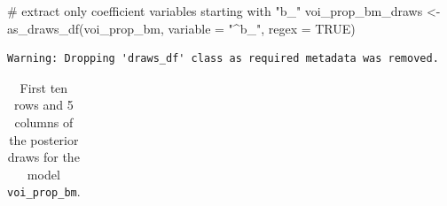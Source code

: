 \documentclass[
  authoryear,
  preprint,
  3p]{elsarticle}
\newenvironment{Shaded}{\begin{snugshade}}{\end{snugshade}}
\newcommand{\AttributeTok}[1]{\textcolor[rgb]{0.40,0.45,0.13}{#1}}
\newcommand{\CommentTok}[1]{\textcolor[rgb]{0.37,0.37,0.37}{#1}}
\newcommand{\ConstantTok}[1]{\textcolor[rgb]{0.56,0.35,0.01}{#1}}
\newcommand{\FunctionTok}[1]{\textcolor[rgb]{0.28,0.35,0.67}{#1}}
\newcommand{\NormalTok}[1]{\textcolor[rgb]{0.00,0.23,0.31}{#1}}
\newcommand{\OtherTok}[1]{\textcolor[rgb]{0.00,0.23,0.31}{#1}}
\newcommand{\StringTok}[1]{\textcolor[rgb]{0.13,0.47,0.30}{#1}}
\begin{document}
\begin{Shaded}
\begin{Highlighting}[]
\CommentTok{\# extract only coefficient variables starting with "b\_"}
\NormalTok{voi\_prop\_bm\_draws }\OtherTok{\textless{}{-}} \FunctionTok{as\_draws\_df}\NormalTok{(voi\_prop\_bm, }\AttributeTok{variable =} \StringTok{"\^{}b\_"}\NormalTok{, }\AttributeTok{regex =} \ConstantTok{TRUE}\NormalTok{)}
\end{Highlighting}
\end{Shaded}

\begin{verbatim}
Warning: Dropping 'draws_df' class as required metadata was removed.
\end{verbatim}

\begin{longtable}[]{@{}
  >{\raggedleft\arraybackslash}p{}
  >{\raggedleft\arraybackslash}p{}
  >{\raggedleft\arraybackslash}p{}
  >{\raggedleft\arraybackslash}p{}
  >{\raggedleft\arraybackslash}p{}@{}}

\caption{\label{tbl-voi-prop-draws}First ten rows and 5 columns of the
posterior draws for the model \texttt{voi\_prop\_bm}.}

\tabularnewline


\end{longtable}
\end{document}
